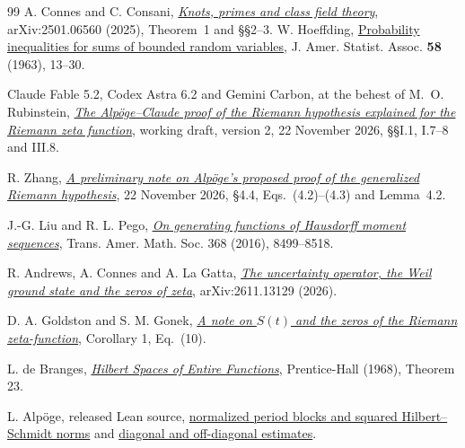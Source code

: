\documentclass[11pt,letterpaper]{article}
\numberwithin{equation}{section}
\begin{document}
\begin{thebibliography}{99}
 A. Connes and C. Consani, \href{https://arxiv.org/html/2501.06560v1}{\emph{Knots, primes and class field theory}}, arXiv:2501.06560 (2025), Theorem~1 and \S\S2--3.
 W. Hoeffding, \href{https://doi.org/10.1080/01621459.1963.10500830}{Probability inequalities for sums of bounded random variables}, J. Amer. Statist. Assoc. \textbf{58} (1963), 13--30.

 Claude Fable 5.2, Codex Astra 6.2 and Gemini Carbon, at the behest of M.~O. Rubinstein,
\href{https://www.math.uwaterloo.ca/~mrubinst/alpoge_claude_grh/zeta-paper_v2.pdf}{\emph{The Alp\"oge--Claude proof of the Riemann hypothesis explained for the Riemann zeta function}},
working draft, version 2, 22 November 2026, \S\S I.1, I.7--8 and III.8.

 R. Zhang,
\href{https://www.ihes.fr/~rzhang/files/GRH\%20note.pdf}{\emph{A preliminary note on Alp\"oge's proposed proof of the generalized Riemann hypothesis}},
22 November 2026, \S4.4, Eqs.~(4.2)--(4.3) and Lemma~4.2.

 J.-G. Liu and R. L. Pego, \href{https://arxiv.org/abs/1401.8052}{\emph{On generating functions of Hausdorff moment sequences}}, Trans. Amer. Math. Soc. 368 (2016), 8499--8518.

 R. Andrews, A. Connes and A. La Gatta, \href{https://arxiv.org/abs/2611.13129}{\emph{The uncertainty operator, the Weil ground state and the zeros of zeta}}, arXiv:2611.13129 (2026).

 D. A. Goldston and S. M. Gonek, \href{https://arxiv.org/abs/math/0511092}{\emph{A note on $S(t)$ and the zeros of the Riemann zeta-function}}, Corollary 1, Eq.~(10).

 L. de Branges, \href{https://www.math.purdue.edu/~branges/Hilbert%20Spaces%20of%20Entire%20Functions.pdf}{\emph{Hilbert Spaces of Entire Functions}}, Prentice-Hall (1968), Theorem 23.

 L. Alp\"oge, released Lean source, \href{https://github.com/leanprover-community/riemann-hypothesis/blob/40e56bab026552e089d7afcfeff08d2defb9c005/src/Formalism/SharpRestriction/CuspSpanNormBounds/RelevantZeroGramTerms.lean}{normalized period blocks and squared Hilbert--Schmidt norms} and \href{https://github.com/leanprover-community/riemann-hypothesis/blob/40e56bab026552e089d7afcfeff08d2defb9c005/src/Formalism/SharpRestriction/GlobalTheoremInputs.lean}{diagonal and off-diagonal estimates}.


\end{thebibliography}
\end{document}
